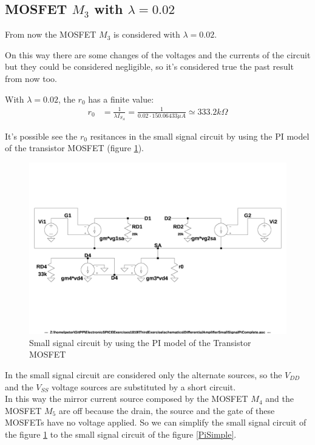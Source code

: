 \subsection{MOSFET $M_3$ with $\lambda = 0.02$}
From now the MOSFET $M_3$ is considered with $\lambda = 0.02$.\par
On this way there are some changes of the voltages and the currents of the circuit but they could be considered negligible, so it's considered true the past result from now too.\par
With $\lambda = 0.02$, the $r_0$ has a finite value:\\
\begin{align}
r_0 &= \frac{1}{\lambda I_{S_A}}
= \frac{1}{0.02 \cdot 150.06433 \mu A}
\simeq 333.2k\Omega
\end{align}

It's possible see the $r_0$ resitances in the small signal circuit by using the PI model of the transistor MOSFET (figure \ref{PiComplete}).\par

\begin{figure}[h]
  \centering
  \includegraphics[width=12cm]{schematics/DifferentialAmplifier/SmallSignalPiComplete.jpg}
  \caption{Small signal circuit by using the PI model of the Transistor MOSFET}
  \label{PiComplete}
\end{figure}

In the small signal circuit are considered only the alternate sources, so the $V_{DD}$ and the $V_{SS}$ voltage sources are substituted by a short circuit.\\
In this way the mirror current source composed by the MOSFET $M_4$ and the MOSFET $M_5$ are off because the drain, the source and the gate of these MOSFETs have no voltage applied. So we can simplify the small signal circuit of the figure \ref{PiComplete} to the small signal circuit of the figure \ref{PiSimple}.\par

